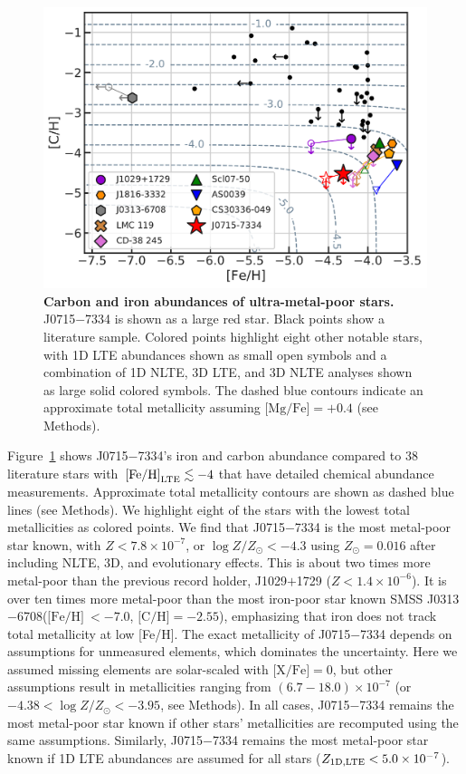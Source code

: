 \documentclass{natureprintstyle}
\newcommand{\unit}[1]{\ensuremath{\mathrm{\,#1}}\xspace}
\newcommand{\feh}{\unit{[Fe/H]}}
\newcommand{\logzzsun}{\ensuremath{\log Z/Z_\odot}\xspace}
\newcommand{\umpstar}{J0715$-$7334\xspace}
\newcommand{\caffaustar}{J1029$+$1729\xspace}
\newcommand{\kellerstar}{SMSS J0313$-$6708\xspace}
\begin{document}
\begin{figure}[h!]
\centering
\includegraphics[width=\linewidth]{nature_2a_fehch.pdf}
\vspace{-4mm}
\caption{\textbf{Carbon and iron abundances of ultra-metal-poor stars.}
\umpstar is shown as a large red star. Black points show a literature sample\cite{Abohalima2018,Sestito2019}. Colored points highlight eight other notable stars, with 1D LTE abundances shown as small open symbols and a combination of 1D NLTE, 3D LTE, and 3D NLTE analyses shown as large solid colored symbols. The dashed blue contours indicate an approximate total metallicity assuming $\mbox{[Mg/Fe]}=+0.4$ (see Methods). 
\label{fig:cfe}
}
\end{figure}

Figure~\ref{fig:cfe} shows \umpstar’s iron and carbon abundance compared to 38 literature stars with $\feh_{\rm LTE} \lesssim -4$ that have detailed chemical abundance measurements. Approximate total metallicity contours are shown as dashed blue lines (see Methods). We highlight eight of the stars with the lowest total metallicities as colored points\cite{Cayrel2004,Lai2008,Caffau2011,Keller2014,Howes2015,Simon2015,Skuladottir2024,Chiti2024}.
We find that \umpstar is the most metal-poor star known, with $Z < 7.8 \times 10^{-7}$, or $\logzzsun < -4.3$ using $Z_\odot = 0.016$\cite{Lodders2025} after including NLTE, 3D, and evolutionary effects.
This is about two times more metal-poor than the previous record holder, {\caffaustar}\cite{Lagae2023,Caffau2024} ($Z < 1.4 \times 10^{-6}$).
It is over ten times more metal-poor than the most iron-poor star known \kellerstar ($\mbox{[Fe/H]}~{<}-7.0$, $\mbox{[C/H]}=-2.55$){\cite{Nordlander2017}}, emphasizing that iron does not track total metallicity at low [Fe/H].
The exact metallicity of \umpstar depends on assumptions for unmeasured elements, which dominates the uncertainty. 
Here we assumed missing elements are solar-scaled with $\mbox{[X/Fe]}=0$, but other assumptions result in metallicities ranging from $(6.7-18.0) \times 10^{-7}$ (or $-4.38 < \logzzsun < -3.95$, see Methods). In all cases, \umpstar remains the most metal-poor star known if other stars' metallicities are recomputed using the same assumptions.
Similarly, \umpstar remains the most metal-poor star known if 1D LTE abundances are assumed for all stars ($Z_{\rm 1D,LTE} < 5.0 \times 10^{-7}$).
\end{document}
